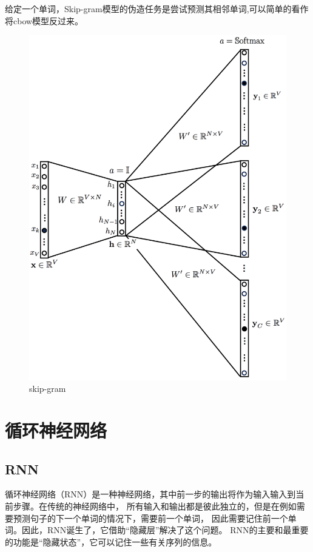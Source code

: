 给定一个单词，Skip-gram模型的伪造任务是尝试预测其相邻单词,可以简单的看作将cbow模型反过来。

\begin{figure}[htbp]
  \centering
  \includegraphics[scale=0.15]{./images/skip.jpg}
  \caption{skip-gram}
  \label{fig:skip}
\end{figure}

\section{循环神经网络}

\subsection{RNN}

循环神经网络（RNN）是一种神经网络，其中前一步的输出将作为输入输入到当前步骤。在传统的神经网络中，
所有输入和输出都是彼此独立的，但是在例如需要预测句子的下一个单词的情况下，需要前一个单词，
因此需要记住前一个单词。因此，RNN诞生了，它借助“隐藏层”解决了这个问题。
RNN的主要和最重要的功能是“隐藏状态”，它可以记住一些有关序列的信息。


